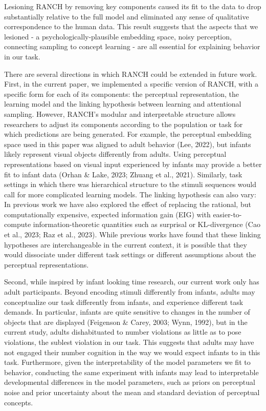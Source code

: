 \documentclass[10pt, letterpaper]{article}
\begin{document}
Lesioning RANCH by removing key components caused its fit to the data to
drop substantially relative to the full model and eliminated any sense
of qualitative correspondence to the human data. This result suggests
that the aspects that we lesioned - a psychologically-plausible
embedding space, noisy perception, connecting sampling to concept
learning - are all essential for explaining behavior in our task.

There are several directions in which RANCH could be extended in future
work. First, in the current paper, we implemented a specific version of
RANCH, with a specific form for each of its components: the perceptual
representation, the learning model and the linking hypothesis between
learning and attentional sampling. However, RANCH's modular and
interpretable structure allows researchers to adjust its components
according to the population or task for which predictions are being
generated. For example, the perceptual embedding space used in this
paper was aligned to adult behavior (Lee, 2022), but infants likely
represent visual objects differently from adults. Using perceptual
representations based on visual input experienced by infants may provide
a better fit to infant data (Orhan \& Lake, 2023; Zhuang et al., 2021).
Similarly, task settings in which there was hierarchical structure to
the stimuli sequences would call for more complicated learning models.
The linking hypothesis can also vary: In previous work we have also
explored the effect of replacing the rational, but computationally
expensive, expected information gain (EIG) with easier-to-compute
information-theoretic quantities such as surprisal or KL-divergence (Cao
et al., 2023; Raz et al., 2023). While previous works have found that
these linking hypotheses are interchangeable in the current context, it
is possible that they would dissociate under different task settings or
different assumptions about the perceptual representations.

Second, while inspired by infant looking time research, our current work
only has adult participants. Beyond encoding stimuli differently from
infants, adults may conceptualize our task differently from infants, and
experience different task demands. In particular, infants are quite
sensitive to changes in the number of objects that are displayed
(Feigenson \& Carey, 2003; Wynn, 1992), but in the current study, adults
dishabituated to number violations as little as to pose violations, the
sublest violation in our task. This suggests that adults may have not
engaged their number cognition in the way we would expect infants to in
this task. Furthermore, given the interpretability of the model
parameters we fit to behavior, conducting the same experiment with
infants may lead to interpretable developmental differences in the model
parameters, such as priors on perceptual noise and prior uncertainty
about the mean and standard deviation of perceptual concepts.
\end{document}
